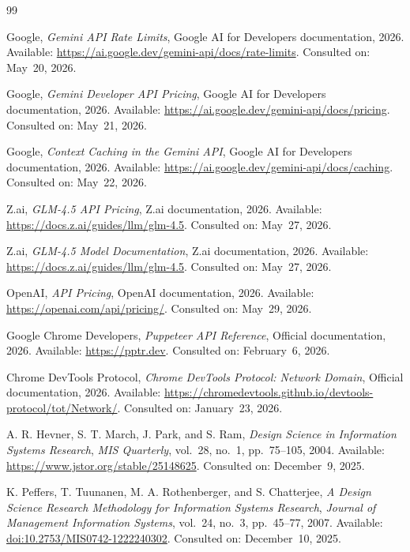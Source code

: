 \documentclass[12pt,a4paper,twoside]{report}
\begin{document}
\begingroup
\small
\begin{thebibliography}{99}


Google,
\emph{Gemini API Rate Limits},
Google AI for Developers documentation, 2026.
Available: \url{https://ai.google.dev/gemini-api/docs/rate-limits}. Consulted on: May~20, 2026.

Google,
\emph{Gemini Developer API Pricing},
Google AI for Developers documentation, 2026.
Available: \url{https://ai.google.dev/gemini-api/docs/pricing}. Consulted on: May~21, 2026.

Google,
\emph{Context Caching in the Gemini API},
Google AI for Developers documentation, 2026.
Available: \url{https://ai.google.dev/gemini-api/docs/caching}. Consulted on: May~22, 2026.

Z.ai,
\emph{GLM-4.5 API Pricing},
Z.ai documentation, 2026.
Available: \url{https://docs.z.ai/guides/llm/glm-4.5}. Consulted on: May~27, 2026.

Z.ai,
\emph{GLM-4.5 Model Documentation},
Z.ai documentation, 2026.
Available: \url{https://docs.z.ai/guides/llm/glm-4.5}. Consulted on: May~27, 2026.

OpenAI,
\emph{API Pricing},
OpenAI documentation, 2026.
Available: \url{https://openai.com/api/pricing/}. Consulted on: May~29, 2026.


Google Chrome Developers,
\emph{Puppeteer API Reference},
Official documentation, 2026.
Available: \url{https://pptr.dev}. Consulted on: February~6, 2026.

Chrome DevTools Protocol,
\emph{Chrome DevTools Protocol: Network Domain},
Official documentation, 2026.
Available: \url{https://chromedevtools.github.io/devtools-protocol/tot/Network/}. Consulted on: January~23, 2026.


A. R. Hevner, S. T. March, J. Park, and S. Ram,
\emph{Design Science in Information Systems Research},
\emph{MIS Quarterly}, vol.~28, no.~1, pp.~75--105, 2004.
Available: \url{https://www.jstor.org/stable/25148625}. Consulted on: December~9, 2025.

K. Peffers, T. Tuunanen, M. A. Rothenberger, and S. Chatterjee,
\emph{A Design Science Research Methodology for Information Systems Research},
\emph{Journal of Management Information Systems}, vol.~24, no.~3, pp.~45--77, 2007.
Available: \href{https://doi.org/10.2753/MIS0742-1222240302}{doi:10.2753/MIS0742-1222240302}. Consulted on: December~10, 2025.


\end{thebibliography}
\end{document}
